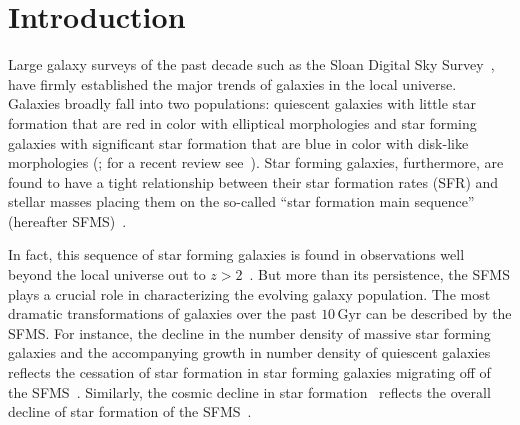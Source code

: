 \documentclass[preprint2,tighten]{aastex62}
\newcommand{\todo}[1]{{\bf \textcolor{red}{ #1}}}
\begin{document}
\section{Introduction}
Large galaxy surveys of the past decade such as the Sloan Digital Sky 
Survey~\citep[SDSS;][]{york2000}, have firmly established the major 
trends of galaxies in the local universe. Galaxies %
broadly fall into two populations: quiescent galaxies with little star
formation that are red in color with elliptical morphologies and star 
forming galaxies with significant star formation that are blue in color 
with disk-like morphologies 
(\citealt{kauffmann2003, blanton2003, baldry2006, taylor2009, moustakas2013}; 
for a recent review see~\citealt{blanton2009}). 
Star forming galaxies, furthermore, are found to have a tight relationship 
between their star formation rates (SFR) and stellar masses placing them
on the so-called ``star formation main sequence'' (hereafter 
SFMS)~\citep[\emph{e.g.}][]{noeske2007, daddi2007, salim2007}.


In fact, this sequence of star forming galaxies is found in observations 
well beyond the local universe out to $z > 2$~\citep{wang2013, schreiber2015}.
But more than its persistence, the SFMS plays a crucial role in characterizing 
the evolving galaxy population. The most dramatic transformations of 
galaxies over the past $10\,\mathrm{Gyr}$ can be described by the SFMS. 
For instance, the decline in the number density of massive 
star forming galaxies and the accompanying growth in number density of 
quiescent galaxies reflects the cessation of star formation in 
star forming galaxies migrating off of the 
SFMS~\citep{blanton2006, borch2006, bundy2006, moustakas2013}. 
Similarly, the cosmic decline in star formation~\citep{hopkins2006,
behroozi2013a, madau2014} reflects the overall decline of star 
formation of the SFMS~\citep{schreiber2015}. 
\end{document}
